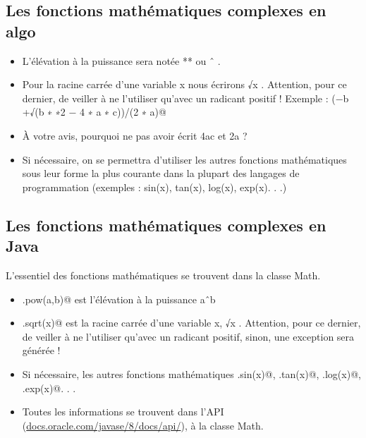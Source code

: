 \documentclass[11pt,a4paper]{article}
\begin{document}
        \subsection{Les fonctions math\'ematiques complexes en algo}
					\begin{itemize}
				
			\item L'\'el\'evation \`a la puissance sera not\'ee ** ou ˆ . 
			\item Pour la racine carr\'ee d'une variable x nous \'ecrirons √x . Attention, pour ce dernier, de veiller \`a ne l'utiliser qu'avec un radicant positif !
            Exemple : \verb@(−b +√(b ∗ ∗2 − 4 ∗ a ∗ c))/(2 ∗ a)@
			\item  \`A votre avis, pourquoi ne pas avoir \'ecrit \guillemotleft  4ac \guillemotright  et \guillemotleft  2a \guillemotright  ?
			\item Si n\'ecessaire, on se permettra d'utiliser les autres fonctions math\'ematiques sous leur forme
            la plus courante dans la plupart des langages de programmation (exemples : sin(x), tan(x), log(x), exp(x). . .)
					\end{itemize}
				
            \par
        \subsection{Les fonctions math\'ematiques complexes en Java}
        L'essentiel des fonctions math\'ematiques se trouvent dans la classe Math.
          
					\begin{itemize}
				
			\item \verb@Math.pow(a,b)@ est l'\'el\'evation \`a la puissance aˆb
			\item \verb@Math.sqrt(x)@ est la racine carr\'ee d'une variable x, √x . Attention, pour ce dernier, de veiller \`a ne l'utiliser qu'avec un radicant positif, sinon, une exception sera g\'en\'er\'ee !
			\item Si n\'ecessaire, les autres fonctions math\'ematiques \verb@Math.sin(x)@, 
            \verb@Math.tan(x)@, \verb@Math.log(x)@, \verb@Math.exp(x)@. . .
			\item Toutes les informations se trouvent dans l'API (\url{docs.oracle.com/javase/8/docs/api/}), \`a la classe Math.
					\end{itemize}
				
            \par
\end{document}
